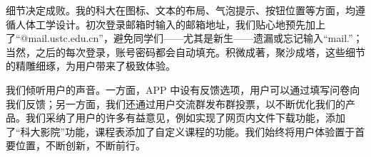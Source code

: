 细节决定成败。我的科大在图标、文本的布局、气泡提示、按钮位置等方面，均遵循人体工学设计。初次登录邮箱时输入的邮箱地址，我们贴心地预先加上了“@mail.ustc.edu.cn”，避免同学们——尤其是新生——遗漏或忘记输入“mail.”；当然，之后的每次登录，账号密码都会自动填充。积微成著，聚沙成塔，这些细节的精雕细琢，为用户带来了极致体验。

我们倾听用户的声音。一方面，APP 中设有反馈选项，用户可以通过填写问卷向我们反馈；另一方面，我们还通过用户交流群发布群投票，以不断优化我们的产品。我们采纳了用户的许多有益意见，例如实现了网页内文件下载功能，添加了“科大影院”功能，课程表添加了自定义课程的功能。我们始终将用户体验置于首要位置，不断创新，不断前行。
